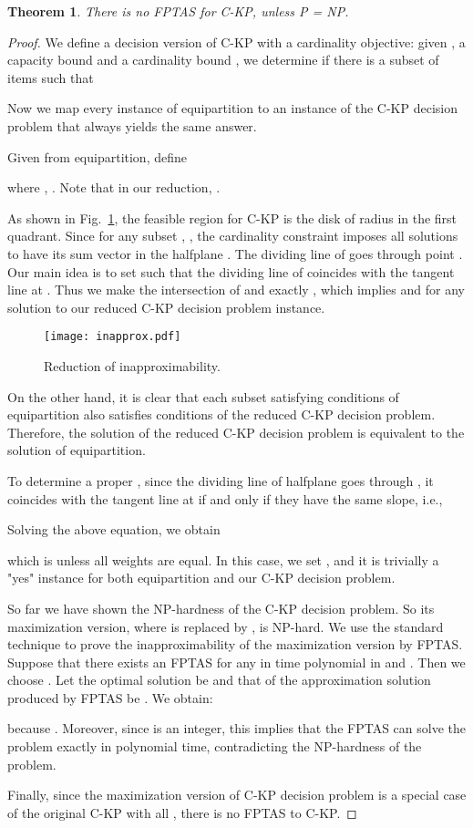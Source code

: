 \documentclass{aamas2013}
\newtheorem{theorem}{Theorem}[section]
\begin{document}
\begin{theorem}
There is no FPTAS for {\sc C-KP}, unless P = NP.
\end{theorem}
\begin{proof}
We define a decision version of {\sc C-KP} with a cardinality objective: given , a capacity bound  and a cardinality bound , we determine if there is a subset of items  such that


Now we map every instance of {\sc equipartition} to an instance of the {\sc C-KP} decision problem that always yields the same answer.
  

Given  from {\sc equipartition}, define 


where , .  Note that in our reduction, .

As shown in Fig.~\ref{fig:inapprox}, the feasible region  for {\sc C-KP} is the  disk of radius  in the first quadrant.  Since for any subset , 
,
the cardinality constraint  imposes all solutions to have its sum vector in the halfplane  .  The dividing line of  goes through point  .  Our main idea is to set  such that the dividing line of  coincides with the tangent line at .  Thus we make the intersection of  and  exactly , which implies    
 and  for any solution  to our reduced {\sc C-KP} decision problem instance.

\begin{figure}[htb!]
 \centering
 \texttt{[image: inapprox.pdf]} \caption{Reduction of inapproximability.} \label{fig:inapprox}
\end{figure}

On the other hand, it is clear that each subset  satisfying conditions of {\sc equipartition} also satisfies conditions of the reduced {\sc C-KP} decision problem.  Therefore, the solution of the reduced {\sc C-KP} decision problem is equivalent to the solution of {\sc equipartition}.

To determine a proper , since the dividing line of halfplane  goes through , it coincides with the tangent line at  if and only if they have the same slope, i.e.,

Solving the above equation, we obtain

which is  unless all weights are equal.  In this case, we set , and it is trivially a "yes" instance for both {\sc equipartition} and our C-KP decision problem.

So far we have shown the NP-hardness of the C-KP decision problem.  So its maximization version, where  is replaced by , is NP-hard.  We use the standard technique to prove the inapproximability of the maximization version by FPTAS. Suppose that there exists an FPTAS for any  in time polynomial in  and . Then we choose . Let the optimal solution be  and that of the approximation solution produced by FPTAS be . We obtain:

because . Moreover, since  is an integer, this implies that the FPTAS can solve the problem exactly in polynomial time, contradicting the NP-hardness of the problem. 

Finally, since the maximization version of C-KP decision problem is a special case of the original C-KP with all , there is no FPTAS to {\sc C-KP}. 
\end{proof} 
\end{document}
